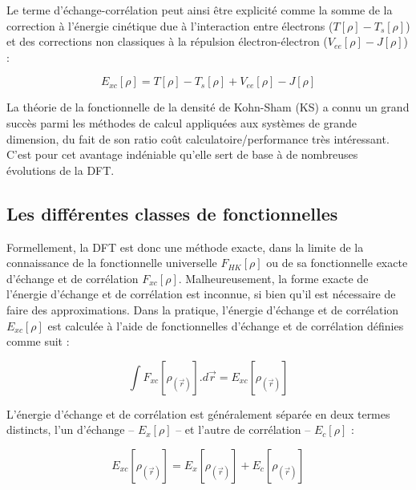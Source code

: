	Le terme d'échange-corrélation peut ainsi être explicité comme la somme de la correction à l'énergie cinétique due à l'interaction entre électrons ($T[\rho] - T_{s}[\rho]$) et des corrections non classiques à la répulsion électron-électron ($V_{ee}[\rho] - J[\rho]$) :
	
	\begin{equation}
	E_{xc}[\rho] = T[\rho] - T_{s}[\rho] + V_{ee}[\rho] - J[\rho]
	\end{equation}
	
	La théorie de la fonctionnelle de la densité de Kohn-Sham (KS) a connu un grand succès parmi les méthodes de calcul appliquées aux systèmes de grande dimension, du fait de son ratio coût calculatoire/performance très intéressant. C'est pour cet avantage indéniable qu'elle sert de base à de nombreuses évolutions de la DFT.
	
	\subsection{Les différentes classes de fonctionnelles}
	
	Formellement, la DFT est donc une méthode exacte, dans la limite de la connaissance de la fonctionnelle universelle $F_{HK}[\rho]$ ou de sa fonctionnelle exacte d’échange et de corrélation $F_{xc}[\rho]$. Malheureusement, la forme exacte de l’énergie d’échange et de corrélation est inconnue, si bien qu’il est nécessaire de faire des approximations. Dans la pratique, l’énergie d’échange et de corrélation $E_{xc}[\rho]$ est calculée à l’aide de fonctionnelles d’échange et de corrélation définies comme suit :
	
	\begin{equation}
	\int F_{xc}[\rho_{(\vec{r})}].d\vec{r} = E_{xc}[\rho_{(\vec{r})}]
	\end{equation}
	
	L’énergie d’échange et de corrélation est généralement séparée en deux termes distincts, l’un d’échange -- $E_{x}[\rho]$ -- et l’autre de corrélation -- $E_{c}[\rho]$ :
	
	\begin{equation}
	E_{xc}[\rho_{(\vec{r})}] = E_{x}[\rho_{(\vec{r})}] + E_{c}[\rho_{(\vec{r})}]
	\end{equation}
	

